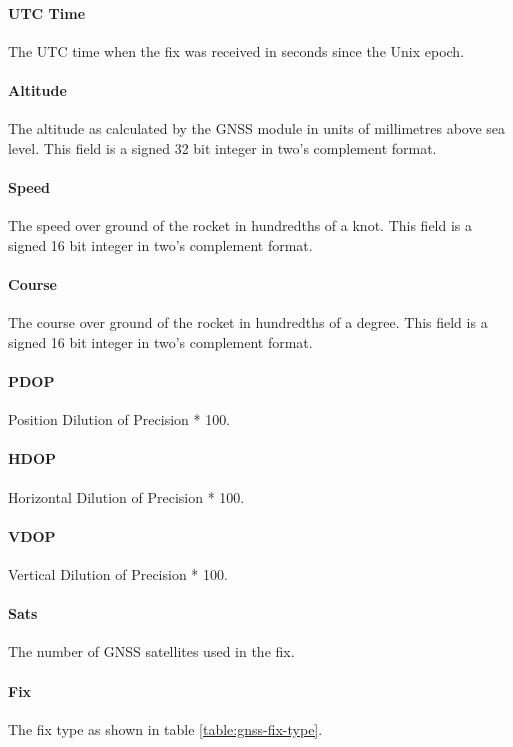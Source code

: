 \paragraph{UTC Time}
The UTC time when the fix was received in seconds since the Unix epoch.

\paragraph{Altitude}
The altitude as calculated by the GNSS module in units of millimetres above sea level. This field is a signed 32 bit
integer in two's complement format.

\paragraph{Speed}
The speed over ground of the rocket in hundredths of a knot. This field is a signed 16 bit integer in two's complement
format.

\paragraph{Course}
The course over ground of the rocket in hundredths of a degree. This field is a signed 16 bit integer in two's
complement format.

\paragraph{PDOP}
Position Dilution of Precision * 100.

\paragraph{HDOP}
Horizontal Dilution of Precision * 100.

\paragraph{VDOP}
Vertical Dilution of Precision * 100.

\paragraph{Sats}
The number of GNSS satellites used in the fix.

\paragraph{Fix}
The fix type as shown in table \ref{table:gnss-fix-type}.

